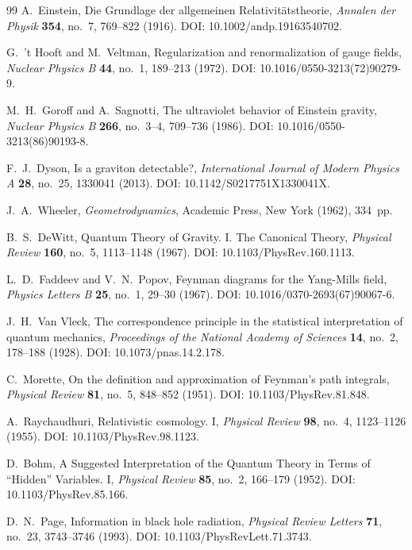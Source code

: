 \clearpage
{}
{}
\begin{thebibliography}{99}
A.~Einstein, Die Grundlage der allgemeinen Relativit\"atstheorie, \textit{Annalen der Physik} \textbf{354}, no.~7, 769--822 (1916). DOI: 10.1002/andp.19163540702.

G.~'t Hooft and M.~Veltman, Regularization and renormalization of gauge fields, \textit{Nuclear Physics B} \textbf{44}, no.~1, 189--213 (1972). DOI: 10.1016/0550-3213(72)90279-9.

M.~H.~Goroff and A.~Sagnotti, The ultraviolet behavior of Einstein gravity, \textit{Nuclear Physics B} \textbf{266}, no.~3--4, 709--736 (1986). DOI: 10.1016/0550-3213(86)90193-8.

F.~J.~Dyson, Is a graviton detectable?, \textit{International Journal of Modern Physics A} \textbf{28}, no.~25, 1330041 (2013). DOI: 10.1142/S0217751X1330041X.

J.~A.~Wheeler, \textit{Geometrodynamics}, Academic Press, New York (1962), 334~pp.

B.~S.~DeWitt, Quantum Theory of Gravity. I. The Canonical Theory, \textit{Physical Review} \textbf{160}, no.~5, 1113--1148 (1967). DOI: 10.1103/PhysRev.160.1113.

L.~D.~Faddeev and V.~N.~Popov, Feynman diagrams for the Yang-Mills field, \textit{Physics Letters B} \textbf{25}, no.~1, 29--30 (1967). DOI: 10.1016/0370-2693(67)90067-6.

J.~H.~Van Vleck, The correspondence principle in the statistical interpretation of quantum mechanics, \textit{Proceedings of the National Academy of Sciences} \textbf{14}, no.~2, 178--188 (1928). DOI: 10.1073/pnas.14.2.178.

C.~Morette, On the definition and approximation of Feynman's path integrals, \textit{Physical Review} \textbf{81}, no.~5, 848--852 (1951). DOI: 10.1103/PhysRev.81.848.

A.~Raychaudhuri, Relativistic cosmology. I, \textit{Physical Review} \textbf{98}, no.~4, 1123--1126 (1955). DOI: 10.1103/PhysRev.98.1123.

D.~Bohm, A Suggested Interpretation of the Quantum Theory in Terms of ``Hidden'' Variables. I, \textit{Physical Review} \textbf{85}, no.~2, 166--179 (1952). DOI: 10.1103/PhysRev.85.166.

D.~N.~Page, Information in black hole radiation, \textit{Physical Review Letters} \textbf{71}, no.~23, 3743--3746 (1993). DOI: 10.1103/PhysRevLett.71.3743.


\end{thebibliography}
